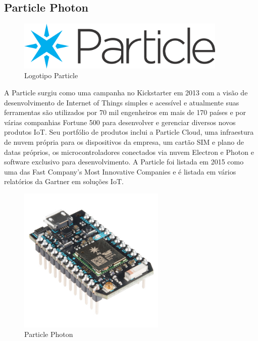 	
	
	\subsection{Particle Photon}\label{subsec-photon}

		 \begin{figure}[h!]
		\caption{\label{fig_particle}  Logotipo Particle}
		\begin{center}
			\includegraphics[width=100mm]{particle_logo.png}	
		\end{center}
		\end{figure}
	 A Particle surgiu como uma campanha no Kickstarter em 2013 com a visão de desenvolvimento de Internet of Things simples e acessível e atualmente suas ferramentas são utilizados por 70 mil engenheiros em mais de 170 países e por várias companhias Fortune 500 para desenvolver e gerenciar diversos novos produtos IoT. Seu portfólio  de produtos inclui a Particle Cloud, uma infraestura de nuvem própria para os dispositivos da empresa, um cartão SIM e plano de datas próprios, os microcontroladores conectados via nuvem Electron e Photon e software exclusivo para desenvolvimento. A Particle foi listada em 2015 como uma das Fast Company’s Most Innovative Companies  e é listada em vários relatórios da Gartner em soluções IoT. \par
	\begin{figure}[h!]
	\caption{\label{fig_photon}  Particle Photon}
	\begin{center}
		\includegraphics[width=70mm]{photon.jpg}	
	\end{center}
\end{figure}		 	


